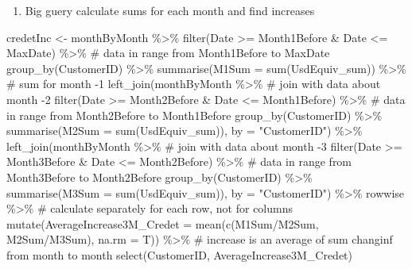 \documentclass[
  letterpaper,
  DIV=11,
  numbers=noendperiod]{scrreprt}
\newenvironment{Shaded}{\begin{snugshade}}{\end{snugshade}}
\newcommand{\AttributeTok}[1]{\textcolor[rgb]{0.40,0.45,0.13}{#1}}
\newcommand{\CommentTok}[1]{\textcolor[rgb]{0.37,0.37,0.37}{#1}}
\newcommand{\FunctionTok}[1]{\textcolor[rgb]{0.28,0.35,0.67}{#1}}
\newcommand{\NormalTok}[1]{\textcolor[rgb]{0.00,0.23,0.31}{#1}}
\newcommand{\OtherTok}[1]{\textcolor[rgb]{0.00,0.23,0.31}{#1}}
\newcommand{\SpecialCharTok}[1]{\textcolor[rgb]{0.37,0.37,0.37}{#1}}
\newcommand{\StringTok}[1]{\textcolor[rgb]{0.13,0.47,0.30}{#1}}
\providecommand{\tightlist}{%
  \setlength{\itemsep}{0pt}\setlength{\parskip}{0pt}}\usepackage{longtable,booktabs,array}
\begin{document}
\begin{enumerate}
\def\labelenumi{\arabic{enumi}.}
\setcounter{enumi}{1}
\tightlist
\item
  Big guery calculate sums for each month and find increases
\end{enumerate}

\begin{Shaded}
\begin{Highlighting}[]
\NormalTok{credetInc }\OtherTok{\textless{}{-}}\NormalTok{ monthByMonth }\SpecialCharTok{\%\textgreater{}\%}
    \FunctionTok{filter}\NormalTok{(Date }\SpecialCharTok{\textgreater{}=}\NormalTok{ Month1Before }\SpecialCharTok{\&}\NormalTok{ Date }\SpecialCharTok{\textless{}=}\NormalTok{ MaxDate) }\SpecialCharTok{\%\textgreater{}\%} \CommentTok{\# data in range from Month1Before to MaxDate}
    \FunctionTok{group\_by}\NormalTok{(CustomerID) }\SpecialCharTok{\%\textgreater{}\%}
    \FunctionTok{summarise}\NormalTok{(}\AttributeTok{M1Sum =} \FunctionTok{sum}\NormalTok{(UsdEquiv\_sum)) }\SpecialCharTok{\%\textgreater{}\%} \CommentTok{\# sum for month {-}1}
    \FunctionTok{left\_join}\NormalTok{(monthByMonth }\SpecialCharTok{\%\textgreater{}\%} \CommentTok{\# join with data about month {-}2}
              \FunctionTok{filter}\NormalTok{(Date }\SpecialCharTok{\textgreater{}=}\NormalTok{ Month2Before }\SpecialCharTok{\&}\NormalTok{ Date }\SpecialCharTok{\textless{}=}\NormalTok{ Month1Before) }\SpecialCharTok{\%\textgreater{}\%} \CommentTok{\# data in range from Month2Before to Month1Before}
              \FunctionTok{group\_by}\NormalTok{(CustomerID) }\SpecialCharTok{\%\textgreater{}\%}
              \FunctionTok{summarise}\NormalTok{(}\AttributeTok{M2Sum =} \FunctionTok{sum}\NormalTok{(UsdEquiv\_sum)), }\AttributeTok{by =} \StringTok{"CustomerID"}\NormalTok{) }\SpecialCharTok{\%\textgreater{}\%}
            \FunctionTok{left\_join}\NormalTok{(monthByMonth }\SpecialCharTok{\%\textgreater{}\%} \CommentTok{\# join with data about month {-}3}
              \FunctionTok{filter}\NormalTok{(Date }\SpecialCharTok{\textgreater{}=}\NormalTok{ Month3Before }\SpecialCharTok{\&}\NormalTok{ Date }\SpecialCharTok{\textless{}=}\NormalTok{ Month2Before) }\SpecialCharTok{\%\textgreater{}\%} \CommentTok{\# data in range from Month3Before to Month2Before}
              \FunctionTok{group\_by}\NormalTok{(CustomerID) }\SpecialCharTok{\%\textgreater{}\%}
              \FunctionTok{summarise}\NormalTok{(}\AttributeTok{M3Sum =} \FunctionTok{sum}\NormalTok{(UsdEquiv\_sum)), }\AttributeTok{by =} \StringTok{"CustomerID"}\NormalTok{) }\SpecialCharTok{\%\textgreater{}\%}
\NormalTok{    rowwise }\SpecialCharTok{\%\textgreater{}\%} \CommentTok{\# calculate separately for each row, not for columns}
    \FunctionTok{mutate}\NormalTok{(}\AttributeTok{AverageIncrease3M\_Credet =} \FunctionTok{mean}\NormalTok{(}\FunctionTok{c}\NormalTok{(M1Sum}\SpecialCharTok{/}\NormalTok{M2Sum, M2Sum}\SpecialCharTok{/}\NormalTok{M3Sum), }\AttributeTok{na.rm =}\NormalTok{ T)) }\SpecialCharTok{\%\textgreater{}\%} \CommentTok{\# increase is an average of sum changinf from month to month}
    \FunctionTok{select}\NormalTok{(CustomerID, AverageIncrease3M\_Credet)}
        

\end{Highlighting}
\end{Shaded}
\end{document}
